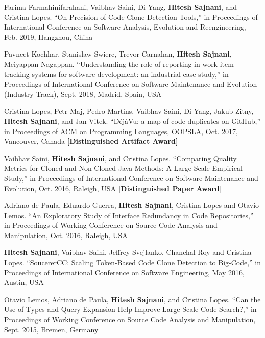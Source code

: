 \documentclass[letterpaper,11pt]{article}
\begin{document}
\begin{etaremune}
\item\small{Farima Farmahinifarahani, Vaibhav Saini, Di Yang, \textbf{Hitesh Sajnani}, and Cristina Lopes. “On Precision of Code Clone Detection Tools,” in Proceedings of International Conference on Software Analysis, Evolution and Reengineering, Feb. 2019, Hangzhou, China}

\item\small{Pavneet Kochhar, Stanislaw Swierc, Trevor Carnahan, \textbf{Hitesh Sajnani}, Meiyappan Nagappan. “Understanding the role of reporting in work item tracking systems for software development: an industrial case study,” in Proceedings of International Conference on Software Maintenance and Evolution (Industry Track), Sept. 2018, Madrid, Spain, USA  }

\item\small{Cristina Lopes, Petr Maj, Pedro Martins, Vaibhav Saini, Di Yang, Jakub Zitny, \textbf{Hitesh Sajnani}, and Jan Vitek. “DéjàVu: a map of code duplicates on GitHub,” in Proceedings of ACM on Programming Languages, OOPSLA, Oct. 2017, Vancouver, Canada \textbf{[Distinguished Artifact Award]}  }

 \item\small{Vaibhav Saini, \textbf{Hitesh Sajnani}, and Cristina Lopes. “Comparing Quality Metrics for
Cloned and Non-Cloned Java Methods: A Large Scale Empirical Study,” in Proceedings
of International Conference on Software Maintenance and Evolution, Oct. 2016,
Raleigh, USA \textbf{[Distinguished Paper Award]}}

 \item\small{Adriano de Paula, Eduardo Guerra, \textbf{Hitesh Sajnani}, Cristina Lopes and Otavio Lemos. “An Exploratory Study of Interface Redundancy in Code Repositories,” in Proceedings of Working Conference on Source Code Analysis and Manipulation, Oct. 2016, Raleigh, USA  }

\item\small{\textbf{Hitesh Sajnani}, Vaibhav Saini, Jeffrey Svejlanko, Chanchal Roy and Cristina Lopes.
“SoucererCC: Scaling Token-Based Code Clone Detection to Big-Code,” in Proceedings
of International Conference on Software Engineering, May 2016, Austin, USA  }

 \item\small{Otavio Lemos, Adriano de Paula, \textbf{Hitesh Sajnani}, and Cristina Lopes. “Can the Use of Types
and Query Expansion Help Improve Large-Scale Code Search?,” in Proceedings of
Working Conference on Source Code Analysis and Manipulation, Sept. 2015, Bremen,
Germany  }


\end{etaremune}
\end{document}
